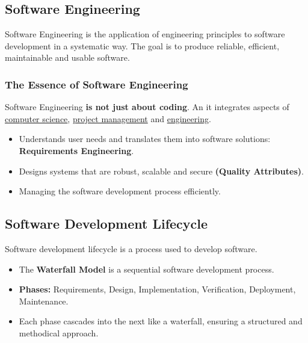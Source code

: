 \subsection{Software Engineering}
Software Engineering is the application of engineering principles to software development in a systematic way. 
The goal is to produce reliable, efficient, maintainable and usable software.

\subsubsection{The Essence of Software Engineering}
Software Engineering \textbf{is not just about coding}. An it integrates aspects of \underline{computer science}, \underline{project management} and \underline{engineering}.

\begin{itemize}
    \item Understands user needs and translates them into software solutions: \textbf{Requirements Engineering}.
    \item Designs systems that are robust, scalable and secure \textbf{(Quality Attributes)}.
    \item Managing the software development process efficiently.
\end{itemize}

\subsection{Software Development Lifecycle}
Software development lifecycle is a process used to develop software.

\begin{itemize}
    \item The \textbf{Waterfall Model} is a sequential software development process.
    \item \textbf{Phases:} Requirements, Design, Implementation, Verification, Deployment, Maintenance.
    \item Each phase cascades into the next like a waterfall, ensuring a structured and methodical approach.
\end{itemize} 
